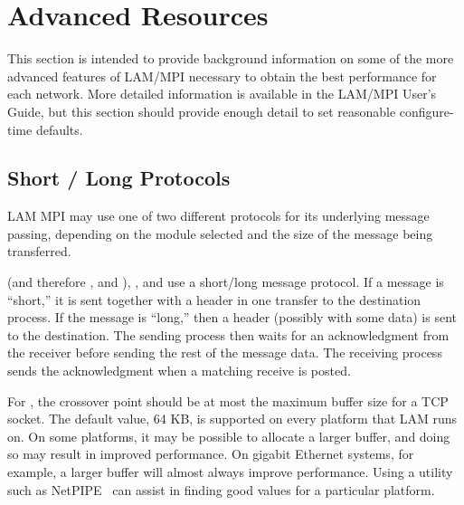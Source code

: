 %
% 
%
%


\chapter{Advanced Resources}
\label{sec:advanced}

This section is intended to provide background information on some of
the more advanced features of LAM/MPI necessary to obtain the best
performance for each network.  More detailed information is available
in the LAM/MPI User's Guide, but this section should provide enough
detail to set reasonable configure-time defaults.



\section{Short / Long Protocols}
\label{sec:advanced:tslproto}

LAM MPI may use one of two different protocols for its underlying
message passing, depending on the module selected and the size of the
message being transferred.

 (and therefore , and ), , and
 use a short/long message protocol. If a message is ``short,''
it is sent together with a header in one transfer to the destination
process.  If the message is ``long,'' then a header (possibly with
some data) is sent to the destination.  The sending process then waits
for an acknowledgment from the receiver before sending the rest of the
message data.  The receiving process sends the acknowledgment when a
matching receive is posted.

For , the crossover point should be at most the maximum
buffer size for a TCP socket.  The default value, 64 KB, is supported
on every platform that LAM runs on.  On some platforms, it may be
possible to allocate a larger buffer, and doing so may result in
improved performance.  On gigabit Ethernet systems, for example, a
larger buffer will almost always improve performance.  Using a utility
such as NetPIPE~\cite{Netpipe96} can assist in finding good values for
a particular platform.

